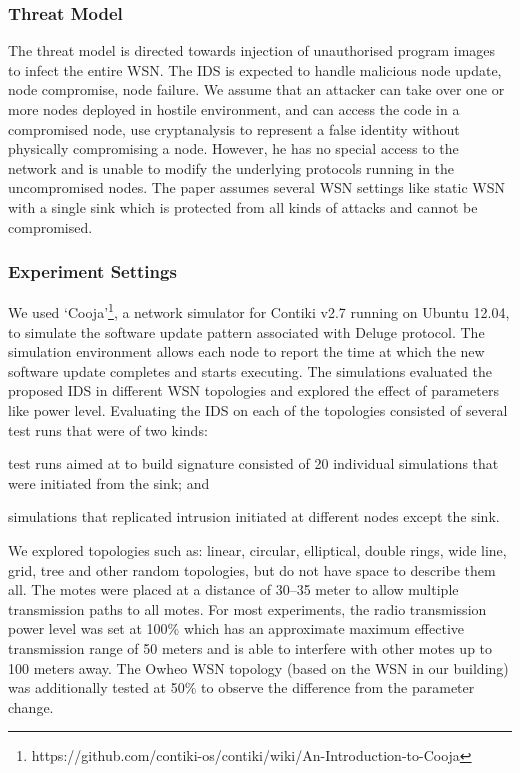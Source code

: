 \documentclass[conference]{IEEEtran}
\begin{document}
\subsubsection*{Threat Model}
The threat model is directed towards injection of unauthorised program images to infect the entire WSN.
The IDS is expected to handle malicious node update, node compromise, node failure.
We assume that an  attacker  can take over one or more nodes deployed in hostile environment, and can access the code in a compromised node, use cryptanalysis to represent a false identity without physically compromising a node.
However, he has  no special  access to  the  network and is unable to modify the underlying protocols running in the uncompromised nodes.
The paper assumes several WSN settings like static WSN with a single  sink which is  protected from all kinds of attacks and cannot be compromised. 
\subsubsection*{Experiment Settings}
\label{subsec:sim_env} 
We used `Cooja'\footnote{https://github.com/contiki-os/contiki/wiki/An-Introduction-to-Cooja}, a network simulator for Contiki v2.7 running on Ubuntu 12.04, to simulate the software update pattern associated with Deluge protocol.
The simulation environment allows each node to report the time at which the new software update completes and starts executing.
The simulations evaluated the proposed IDS in different WSN topologies and explored the effect of parameters like power level.
Evaluating the IDS on each of the topologies consisted of several test runs that  were of two kinds: 
\begin{inparaenum}
\item test runs aimed at to build signature consisted of 20 individual simulations that were initiated from the sink; and
\item simulations that replicated intrusion initiated at different nodes except the sink.
\end{inparaenum}
We explored topologies such as: linear, circular, elliptical, double rings, wide line, grid, tree and other random topologies, but do not have space to describe them all.
The motes were placed at a distance of 30--35 meter to allow  multiple transmission paths to all motes. 
For most experiments, the radio transmission power level was set at 100\% which has an approximate maximum effective transmission range of 50 meters and is able to interfere with other motes up to 100 meters away.
The Owheo WSN topology (based on the WSN in our building) was additionally tested at 50\%  to observe the difference from the parameter change.
\end{document}
